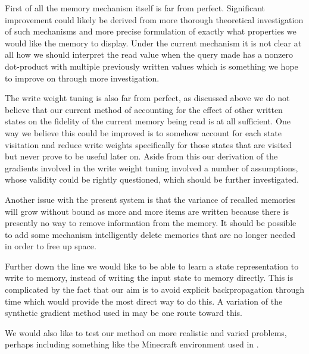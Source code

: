 \documentclass{article}
\begin{document}
First of all the memory mechanism itself is far from perfect. Significant improvement could likely be derived from more thorough theoretical investigation of such mechanisms and more precise formulation of exactly what properties we would like the memory to display. Under the current mechanism it is not clear at all how we should interpret the read value when the query made has a nonzero dot-product with multiple previously written values which is something we hope to improve on through more investigation.

The write weight tuning is also far from perfect, as discussed above we do not believe that our current method of accounting for the effect of other written states on the fidelity of the current memory being read is at all sufficient. One way we believe this could be improved is to somehow account for each state visitation and reduce write weights specifically for those states that are visited but never prove to be useful later on. Aside from this our derivation of the gradients involved in the write weight tuning involved a number of assumptions, whose validity could be rightly questioned, which should be further investigated.

Another issue with the present system is that the variance of recalled memories will grow without bound as more and more items are written because there is presently no way to remove information from the memory. It should be possible to add some mechanism intelligently delete memories that are no longer needed in order to free up space.

Further down the line we would like to be able to learn a state representation to write to memory, instead of writing the input state to memory directly. This is complicated by the fact that our aim is to avoid explicit backpropagation through time which would provide the most direct way to do this. A variation of the synthetic gradient method used in \cite{SYNTH} may be one route toward this.

We would also like to test our method on more realistic and varied problems, perhaps including something like the Minecraft environment used in \cite{MC}.
\end{document}
